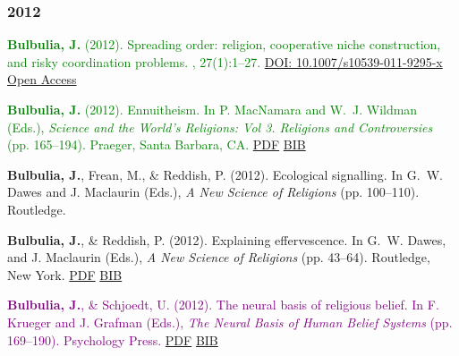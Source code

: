 \documentclass{article}
\begin{document}
\begin{thebibliography}{99}
\subsubsection*{2012} 

\textcolor{Green}{{\bf Bulbulia, J.} (2012).
\newblock Spreading order: religion, cooperative niche construction, and risky
  coordination problems.
, 27(1):1--27.}
\href{https://doi.org/10.1007/s10539-011-9295-x}{DOI: 10.1007/s10539-011-9295-x}
\href{http://www.springerlink.com/content/e4208k071t6164k7/}{Open Access} %


\textcolor{Green}{{\bf Bulbulia, J.} (2012).
\newblock Ennuitheism.
\newblock In P. MacNamara and W.~J. Wildman (Eds.), {\em Science and the
  World's Religions: Vol 3. Religions and Controversies} (pp. 165--194). Praeger, Santa Barbara, CA.} \href{https://www.dropbox.com/s/wgm2tsi4safdmc3/2012_Ennuitheism-bulbulia_published.pdf?dl=0}{PDF} \href{https://www.dropbox.com/s/aalocq092iqrw01/2012.Bulbulia.Ennuitheism.bib?dl=0}{BIB}


{\bf Bulbulia, J.}, Frean, M., \& Reddish, P. (2012).
\newblock Ecological signalling.
\newblock In G.~W. Dawes and J. Maclaurin (Eds.), {\em A New Science of
  Religions} (pp. 100--110). Routledge. %


{\bf Bulbulia, J.}, \& Reddish, P. (2012).
\newblock Explaining effervescence.
\newblock In G.~W. Dawes, and J. Maclaurin (Eds.), {\em A New Science of Religions}
  (pp. 43--64). Routledge, New York. \href{https://www.dropbox.com/s/t67m0qyptuec2ix/BUL_Chap6-ExplEffe-PROOF.pdf?dl=0}{PDF} \href{https://www.dropbox.com/s/23rouucf6vs7igi/2012.explainEfferv.bul.bib?dl=0}{BIB}


\textcolor{Purple}{
{\bf Bulbulia, J.}, \& Schjoedt, U. (2012).
\newblock The neural basis of religious belief.
\newblock In F. Krueger and J. Grafman (Eds.), {\em The Neural Basis of
  Human Belief Systems} (pp. 169--190). Psychology Press. }\href{https://www.dropbox.com/s/lsatbexn9jasbfh/NB09.pdf?dl=0}{PDF} \href{https://www.dropbox.com/s/m4jmcqzi9i3dmj8/2013.Bulbulia.Schoedt.Neural.Belief.bib?dl=0}{BIB}



\end{thebibliography}
\end{document}
